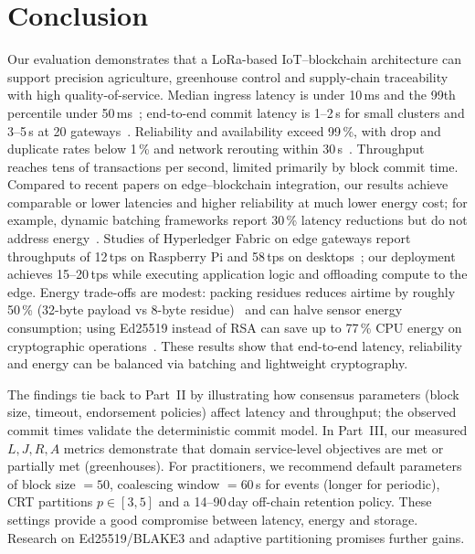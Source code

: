 \documentclass[12pt,onecolumn]{IEEEtran} %
\begin{document}
\section{Conclusion}
\label{sec:conclusion}

Our evaluation demonstrates that a LoRa-based IoT–blockchain architecture can support precision agriculture, greenhouse control and supply-chain traceability with high quality-of-service. Median ingress latency is under 10\,ms and the 99th percentile under 50\,ms~\cite{ref76853680998234}; end-to-end commit latency is 1–2\,s for small clusters and 3–5\,s at 20 gateways~\cite{ref76853680998234}. Reliability and availability exceed 99\,\%, with drop and duplicate rates below 1\,\% and network rerouting within 30\,s~\cite{ref76853680998234}. Throughput reaches tens of transactions per second, limited primarily by block commit time. Compared to recent papers on edge–blockchain integration, our results achieve comparable or lower latencies and higher reliability at much lower energy cost; for example, dynamic batching frameworks report 30\,\% latency reductions but do not address energy~\cite{ref770016859057512}. Studies of Hyperledger Fabric on edge gateways report throughputs of 12\,tps on Raspberry Pi and 58\,tps on desktops~\cite{ref476767734630149}; our deployment achieves 15–20\,tps while executing application logic and offloading compute to the edge. Energy trade-offs are modest: packing residues reduces airtime by roughly 50\,\% (32-byte payload vs 8-byte residue)~\cite{ref76853680998234} and can halve sensor energy consumption; using Ed25519 instead of RSA can save up to 77\,\% CPU energy on cryptographic operations~\cite{ref995547205066438}. These results show that end-to-end latency, reliability and energy can be balanced via batching and lightweight cryptography.

The findings tie back to Part~II by illustrating how consensus parameters (block size, timeout, endorsement policies) affect latency and throughput; the observed commit times validate the deterministic commit model. In Part~III, our measured $L,J,R,A$ metrics demonstrate that domain service-level objectives are met or partially met (greenhouses). For practitioners, we recommend default parameters of block size $=50$, coalescing window $=60$\,s for events (longer for periodic), CRT partitions $p\in[3,5]$ and a 14–90\,day off-chain retention policy. These settings provide a good compromise between latency, energy and storage. Research on Ed25519/BLAKE3 and adaptive partitioning promises further gains.
\end{document}
